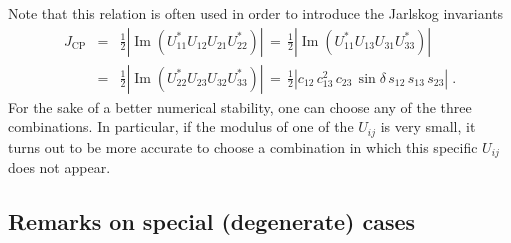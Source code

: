 \documentclass[12pt,a4paper,twoside]{scrartcl}
\DeclareMathOperator{\im}{Im}
\numberwithin{equation}{section}
\numberwithin{table}{section}
\begin{document}
Note that this relation is often used in order to introduce 
the Jarlskog invariants %
\begin{eqnarray}
 J_\mathrm{CP} 
 & = &
 \frac{1}{2} \left| \im (U_{11}^*U_{12}U_{21}U_{22}^*)\right|
 \,=\, 
 \frac{1}{2} \left| \im (U_{11}^*U_{13}U_{31}U_{33}^*)\right|
 \nonumber\\
 & =  &
 \frac{1}{2} \left| \im (U_{22}^*U_{23}U_{32}U_{33}^*)\right|
 \, = \,
 \frac{1}{2}\left|c_{12}\,c_{13}^2\,
    c_{23}\,\sin \delta \,
    s_{12}\,s_{13}\,
    s_{23}\right|\;.
\end{eqnarray}
For the sake of a better numerical stability, one can choose any of the three
combinations. In particular, if the modulus of one of the $U_{ij}$ is very
small, it turns out to be more accurate to choose a combination in which this
specific $U_{ij}$ does not appear.

\subsection{Remarks on special (degenerate) cases}
\label{sec:SpecialCases}
\end{document}
